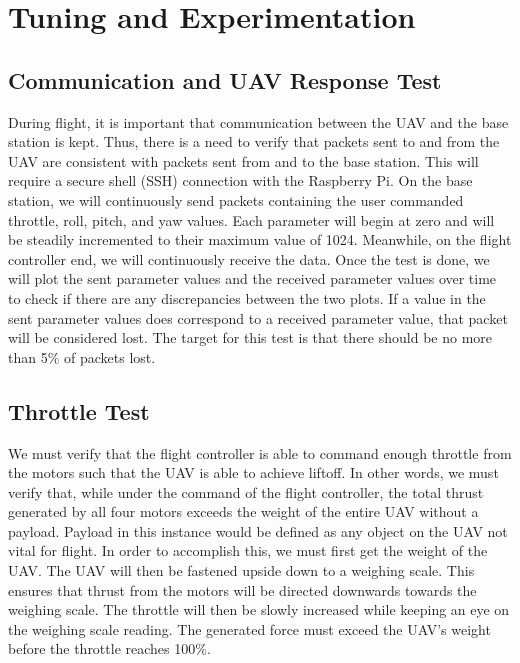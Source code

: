 \documentclass[english]{upeeei}
\begin{document}
\section{Tuning and Experimentation}
\subsection{Communication and UAV Response Test}
During flight, it is important that communication between the UAV and the base station is kept. Thus, there is a need to verify that
packets sent to and from the UAV are consistent with packets sent from and to the base station. This will require a secure shell (SSH) connection with the Raspberry Pi.
On the base station, we will continuously send packets containing the user commanded throttle, roll, pitch, and yaw values. Each
parameter will begin at zero and will be steadily incremented to their maximum value of 1024. Meanwhile, on the flight controller end,
we will continuously receive the data. Once the test is done, we will plot the sent parameter values and the received parameter values
over time to check if there are any discrepancies between the two plots. If a value in the sent parameter values does correspond to a
received parameter value, that packet will be considered lost. The target for this test is that there should be no more than 5\% of
packets lost.
\subsection{Throttle Test}
We must verify that the flight controller is able to command enough throttle from the motors such that the UAV is able to achieve
liftoff. In other words, we must verify that, while under the command of the flight controller, the total thrust generated by all four 
motors exceeds the weight of the entire UAV without a payload. Payload in this instance would be defined as any object on the UAV not
vital for flight. In order to accomplish this, we must first get the weight of the UAV. The UAV will then be fastened upside down to a 
weighing scale. This ensures that thrust from the motors will be directed downwards towards the weighing scale. The throttle will then
be slowly increased while keeping an eye on the weighing scale reading. The generated force must exceed the UAV's weight before the
throttle reaches 100\%.
\end{document}
